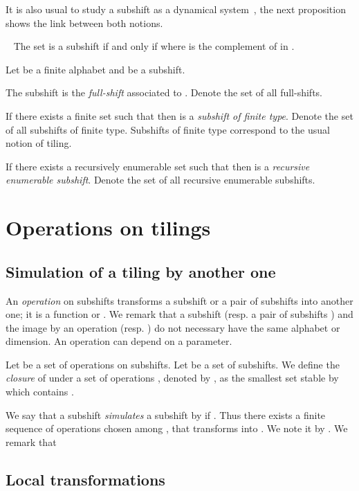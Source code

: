 \documentclass[proceedings]{stacs}
\theoremstyle{plain}\newtheorem{satz}[thm]{Satz}
\theoremstyle{definition}\newtheorem{crucial}[thm]{Crucial Definition}
\begin{document}
It is also usual to study a subshift as a dynamical system~\cite{lind1995isd,kitchens1998sd}, the next proposition shows the link between both notions.

\begin{proposition}~\label{tiling-subshift}
The set  is a subshift if and only if  where  is the complement of  in .
\end{proposition}
\begin{definition}
Let  be a finite alphabet and  be a subshift.

The subshift  is the \emph{full-shift} associated to . Denote  the set of all full-shifts.

If there exists a finite set  such that  then  is a \emph{subshift of finite type}. Denote  the set of all subshifts of finite type. Subshifts of finite type correspond to the usual notion of tiling.

If there exists a recursively enumerable set  such that  then  is a \emph{recursive enumerable subshift}. Denote  the set of all recursive enumerable subshifts.
\end{definition}
\vspace{-0,5cm}
\section{Operations on tilings}\label{operation}

	\subsection{Simulation of a tiling by another one}

An \emph{operation}  on subshifts transforms a subshift or a pair of subshifts into another one; it is a function  or . We remark that a subshift  (resp. a pair of subshifts ) and the image by an operation  (resp. ) do not necessary have the same alphabet or dimension. An operation can depend on a parameter.

Let  be a set of operations on subshifts. Let  be a set of subshifts. We define the \emph{closure} of  under a set of operations , denoted by , as the smallest set stable by  which contains . 

We say that a subshift  \emph{simulates} a subshift  by  if . Thus there exists a finite sequence of operations chosen among , that transforms  into . We note it by . We remark that 

	\subsection{Local transformations}
\end{document}
